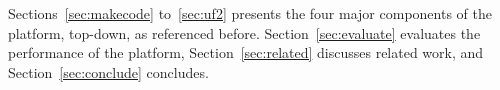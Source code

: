 
Sections~\ref{sec:makecode} to~\ref{sec:uf2} presents the four major components of the platform, top-down,
as referenced before. Section~\ref{sec:evaluate} evaluates the performance of the platform,
Section~\ref{sec:related} discusses related work, and Section~\ref{sec:conclude}
concludes.
